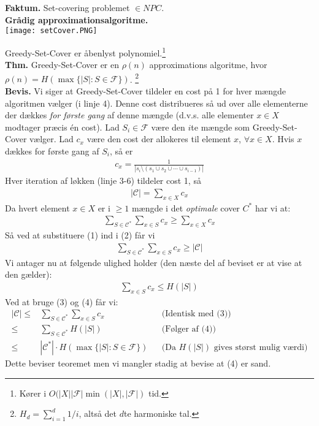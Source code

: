\textbf{Faktum.} Set-covering problemet $\in NPC$. \\

\textbf{Grådig approximationsalgoritme.} \\

\texttt{[image: setCover.PNG]}

Greedy-Set-Cover er åbenlyst polynomiel.\footnote{Kører i $O(|X||\mathcal{F}| \min(|X|,|\mathcal{F}|)$ tid.} \\

\textbf{Thm.} Greedy-Set-Cover er en $\rho(n)$ approximations algoritme, hvor $\rho(n)=H(\max\{|S|: S \in \mathcal{F}\})$. \footnote{$H_d=\sum_{i=1}^d 1/i$, altså det $d$te harmoniske tal.} \\

\textbf{Bevis.} Vi siger at Greedy-Set-Cover tildeler en cost på 1 for hver mængde algoritmen vælger (i linje 4). Denne cost distribueres så ud over alle elementerne der dækkes \textit{for første gang} af denne mængde (d.v.s. alle elementer $x \in X$ modtager præcis én cost). Lad $S_i \in \mathcal{F}$ være den $i$te mængde som Greedy-Set-Cover vælger. Lad $c_x$ være den cost der allokeres til element $x$, $\forall x \in X$. Hvis $x$ dækkes for første gang af $S_i$, så er
\begin{align*}
	c_x= \frac{1}{|s_i \setminus (s_1 \cup s_2 \cup \cdots \cup s_{i-1})|}
\end{align*} 
Hver iteration af løkken (linje 3-6) tildeler cost 1, så
\begin{align}
	|\mathcal{C}|=\sum_{x \in X} c_x
\end{align}
Da hvert element $x \in X$ er i $\ge 1$ mængde i det \textit{optimale} cover $C^*$ har vi at:
\begin{align}
	\sum_{S \in \mathcal{C}^*} \sum_{x \in S} c_x \ge \sum_{x \in X} c_x
\end{align}
Så ved at substituere (1) ind i (2) får vi
\begin{align}
	\sum_{S \in \mathcal{C}^*} \sum_{x \in S} c_x \ge |\mathcal{C}|
\end{align}
Vi antager nu at følgende ulighed holder (den næste del af beviset er at vise at den gælder):
\begin{align}
	\sum_{x \in S} c_x \le H(|S|)
\end{align}
Ved at bruge (3) og (4) får vi:
\begin{align*}	
	|\mathcal{C}| \le& \sum_{S \in \mathcal{C}^*} \sum_{x \in S} c_x && \text{(Identisk med (3))} \\
	\le& \sum_{S \in \mathcal{C}^*} H(|S|) && \text{(Følger af (4))} \\
	\le& |\mathcal{C}^*| \cdot H(\max\{|S|: S \in \mathcal{F}\}) && \text{(Da } H(|S|) \text{ gives størst mulig værdi)}
\end{align*}
Dette beviser teoremet men vi mangler stadig at bevise at (4) er sand. \\

